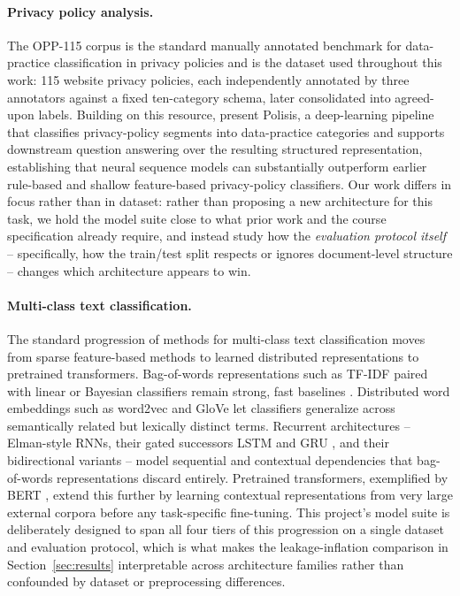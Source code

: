 \documentclass[11pt]{acl}
\begin{document}
\paragraph{Privacy policy analysis.} The OPP-115 corpus
\cite{wilson-etal-2016-creation} is the standard manually annotated benchmark for
data-practice classification in privacy policies and is the dataset used throughout this
work: 115 website privacy policies, each independently annotated by three annotators
against a fixed ten-category schema, later consolidated into agreed-upon labels. Building
on this resource, \citet{harkous-etal-2018-polisis} present Polisis, a deep-learning
pipeline that classifies privacy-policy segments into data-practice categories and
supports downstream question answering over the resulting structured representation,
establishing that neural sequence models can substantially outperform earlier
rule-based and shallow feature-based privacy-policy classifiers. Our work differs in
focus rather than in dataset: rather than proposing a new architecture for this task, we
hold the model suite close to what prior work and the course specification already
require, and instead study how the \emph{evaluation protocol itself} -- specifically,
how the train/test split respects or ignores document-level structure -- changes which
architecture appears to win.

\paragraph{Multi-class text classification.} The standard progression of methods for
multi-class text classification moves from sparse feature-based methods to learned
distributed representations to pretrained transformers. Bag-of-words representations
such as TF-IDF paired with linear or Bayesian classifiers remain strong, fast baselines
\cite{pedregosa-etal-2011-scikit}. Distributed word embeddings such as word2vec
\cite{mikolov-etal-2013-efficient} and GloVe \cite{pennington-etal-2014-glove} let
classifiers generalize across semantically related but lexically distinct terms.
Recurrent architectures -- Elman-style RNNs, their gated successors LSTM
\cite{hochreiter-schmidhuber-1997-lstm} and GRU \cite{cho-etal-2014-learning}, and their
bidirectional variants \cite{schuster-paliwal-1997-bidirectional} -- model sequential
and contextual dependencies that bag-of-words representations discard entirely.
Pretrained transformers, exemplified by BERT \cite{devlin-etal-2019-bert}, extend this
further by learning contextual representations from very large external corpora before
any task-specific fine-tuning. This project's model suite is deliberately designed to
span all four tiers of this progression on a single dataset and evaluation protocol,
which is what makes the leakage-inflation comparison in
Section~\ref{sec:results} interpretable across architecture families rather than
confounded by dataset or preprocessing differences.
\end{document}
